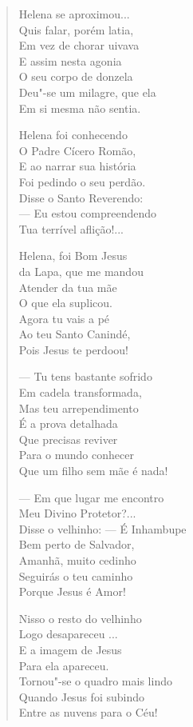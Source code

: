 \begin{verse}
Helena se aproximou... \\
Quis falar, porém latia, \\
Em vez de chorar uivava \\
E assim nesta agonia \\
O seu corpo de donzela \\
Deu"-se um milagre, que ela \\
Em si mesma não sentia. 
\pagebreak

Helena foi conhecendo \\
O Padre Cícero Romão, \\
E ao narrar sua história \\
Foi pedindo o seu perdão. \\
Disse o Santo Reverendo: \\
--- Eu estou compreendendo \\
Tua terrível aflição!... 

Helena, foi Bom Jesus \\
da Lapa, que me mandou \\
Atender da tua mãe \\
O que ela suplicou. \\
Agora tu vais a pé \\
Ao teu Santo Canindé, \\
Pois Jesus te perdoou! 

--- Tu tens bastante sofrido \\
Em cadela transformada, \\
Mas teu arrependimento \\
É a prova detalhada \\
Que precisas reviver \\
Para o mundo conhecer \\
Que um filho sem mãe é nada! 

--- Em que lugar me encontro \\
Meu Divino Protetor?... \\
Disse o velhinho: --- É Inhambupe \\
Bem perto de Salvador, \\
Amanhã, muito cedinho \\
Seguirás o teu caminho \\
Porque Jesus é Amor! 
\pagebreak

Nisso o resto do velhinho \\
Logo desapareceu ... \\
E a imagem de Jesus \\
Para ela apareceu. \\
Tornou"-se o quadro mais lindo \\
Quando Jesus foi subindo \\
Entre as nuvens para o Céu! 


\end{verse}

